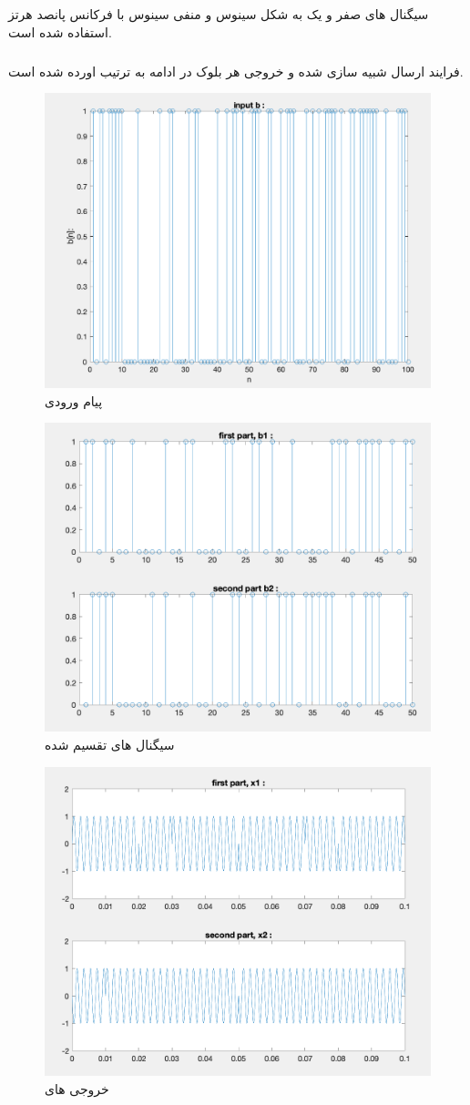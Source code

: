 \documentclass[10pt]{article}
\begin{document}
	\newpage
	\subsection{}
	سیگنال های صفر و یک به شکل سینوس و منفی سینوس با فرکانس پانصد هرتز استفاده شده است.
	
	\subsubsection{}
	فرایند ارسال شبیه سازی شده و خروجی هر بلوک در ادامه به ترتیب اورده شده است.
	
	\begin{figure}[h]
		\centering
		\includegraphics[width=0.5\linewidth]{../img/3.2.1}
		\caption{پیام ورودی}
		\label{fig:3-2-1}
	\end{figure}
	
	\begin{figure}[h]
		\centering
		\includegraphics[width=0.5\linewidth]{../img/3.2.2}
		\caption{سیگنال های تقسیم شده}
		\label{fig:3-2-2}
	\end{figure}
	
	\begin{figure}[h]
		\centering
		\includegraphics[width=0.5\linewidth]{../img/3.2.3}
		\caption{خروجی های
			}
		\label{fig:3-2-3}
	\end{figure}
	
\end{document}

